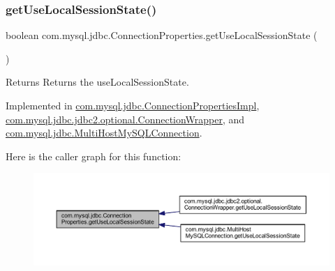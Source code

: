 \subsubsection{\texorpdfstring{get\+Use\+Local\+Session\+State()}{getUseLocalSessionState()}}
{\footnotesize\ttfamily boolean com.\+mysql.\+jdbc.\+Connection\+Properties.\+get\+Use\+Local\+Session\+State (\begin{DoxyParamCaption}{ }\end{DoxyParamCaption})}

\begin{DoxyReturn}{Returns}
Returns the use\+Local\+Session\+State. 
\end{DoxyReturn}


Implemented in \mbox{\hyperlink{classcom_1_1mysql_1_1jdbc_1_1_connection_properties_impl_aeb5f62adfbde0b6fcd7b43565abb6ed5}{com.\+mysql.\+jdbc.\+Connection\+Properties\+Impl}}, \mbox{\hyperlink{classcom_1_1mysql_1_1jdbc_1_1jdbc2_1_1optional_1_1_connection_wrapper_a89f23fef1e3b4df8c13e316baa05bb6a}{com.\+mysql.\+jdbc.\+jdbc2.\+optional.\+Connection\+Wrapper}}, and \mbox{\hyperlink{classcom_1_1mysql_1_1jdbc_1_1_multi_host_my_s_q_l_connection_a816d458e4e3e4cd753a31b84055deef7}{com.\+mysql.\+jdbc.\+Multi\+Host\+My\+S\+Q\+L\+Connection}}.

Here is the caller graph for this function\+:\nopagebreak
\begin{figure}[H]
\begin{center}
\leavevmode
\includegraphics[width=350pt]{interfacecom_1_1mysql_1_1jdbc_1_1_connection_properties_a415c18a036cfda4e12ac4c6952a303b1_icgraph}
\end{center}
\end{figure}
\mbox{\label{interfacecom_1_1mysql_1_1jdbc_1_1_connection_properties_a4f8cf54b1bafd8f3e11f32f5c3609dd6}} 
